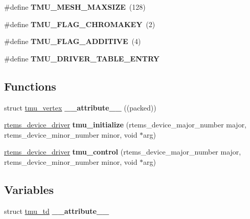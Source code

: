 \begin{DoxyCompactItemize}
\#define {\bfseries T\+M\+U\+\_\+\+M\+E\+S\+H\+\_\+\+M\+A\+X\+S\+I\+ZE}~(128)
\item 
\mbox{\label{group__lm32__milkymist__tmu_gacf7e21d93056c80d183d23d5cb4ded39}} 
\#define {\bfseries T\+M\+U\+\_\+\+F\+L\+A\+G\+\_\+\+C\+H\+R\+O\+M\+A\+K\+EY}~(2)
\item 
\mbox{\label{group__lm32__milkymist__tmu_ga2050a8ba71aebea6270908980dc8c5cc}} 
\#define {\bfseries T\+M\+U\+\_\+\+F\+L\+A\+G\+\_\+\+A\+D\+D\+I\+T\+I\+VE}~(4)
\item 
\#define {\bfseries T\+M\+U\+\_\+\+D\+R\+I\+V\+E\+R\+\_\+\+T\+A\+B\+L\+E\+\_\+\+E\+N\+T\+RY}
\end{DoxyCompactItemize}
\subsection*{Functions}
\begin{DoxyCompactItemize}
\item 
\mbox{\label{group__lm32__milkymist__tmu_ga4fd8b4d1bbfe7c4f7fa043dd77789ea8}} 
struct \mbox{\hyperlink{structtmu__vertex}{tmu\+\_\+vertex}} {\bfseries \+\_\+\+\_\+attribute\+\_\+\+\_\+} ((packed))
\item 
\mbox{\label{group__lm32__milkymist__tmu_ga15cc3ba481c7be47b045655f5cca4bb1}} 
\mbox{\hyperlink{group__ClassicStatus_ga545d41846817eaba6143d52ee4d9e9fe}{rtems\+\_\+device\+\_\+driver}} {\bfseries tmu\+\_\+initialize} (rtems\+\_\+device\+\_\+major\+\_\+number major, rtems\+\_\+device\+\_\+minor\+\_\+number minor, void $\ast$arg)
\item 
\mbox{\label{group__lm32__milkymist__tmu_ga024031752d9710a99344dfec7ee3d74a}} 
\mbox{\hyperlink{group__ClassicStatus_ga545d41846817eaba6143d52ee4d9e9fe}{rtems\+\_\+device\+\_\+driver}} {\bfseries tmu\+\_\+control} (rtems\+\_\+device\+\_\+major\+\_\+number major, rtems\+\_\+device\+\_\+minor\+\_\+number minor, void $\ast$arg)
\end{DoxyCompactItemize}
\subsection*{Variables}
\begin{DoxyCompactItemize}
\item 
\mbox{\label{group__lm32__milkymist__tmu_gad912b4c014dd17c82c75e345ecff8915}} 
struct \mbox{\hyperlink{structtmu__td}{tmu\+\_\+td}} {\bfseries \+\_\+\+\_\+attribute\+\_\+\+\_\+}
\end{DoxyCompactItemize}


